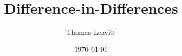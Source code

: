 \documentclass[table, xcolor={dvipsnames}, 9pt]{beamer}
\title[]{Difference-in-Differences} %
\author{Thomas Leavitt} %
\institute[] %
{
\medskip
\textit{} %
}
\date{\today} %
\theoremstyle{newstyle}
\begin{document}
\begin{frame}
\titlepage %
\end{frame}


\end{document}
